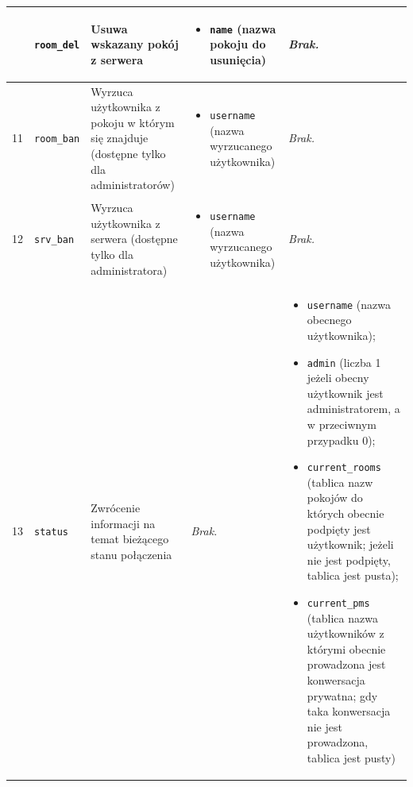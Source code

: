 {\begin{longtable}{ | l | l | l | l | l | }
{} & \parbox[t]{1.7cm}{\strut
	\texttt{room\_del}

\strut} & \parbox{4.1cm}{
	Usuwa wskazany pokój z serwera

} & \parbox{3.9cm}{
	\begin{itemize}
		\item \texttt{name} (nazwa pokoju do usunięcia)
	\end{itemize}


} & \parbox{3.9cm}{
	\textit{Brak.}
} \\

\hline

\parbox[t]{0.8cm}{
	11

} & \parbox[t]{1.7cm}{\strut
	\texttt{room\_ban}

\strut} & \parbox{4.1cm}{
	Wyrzuca użytkownika z pokoju w którym się znajduje (dostępne tylko dla administratorów)

} & \parbox{3.9cm}{
	\begin{itemize}
		\item \texttt{username} (nazwa wyrzucanego użytkownika)
	\end{itemize}


} & \parbox{3.9cm}{
	\textit{Brak.}
} \\

\hline

\parbox[t]{0.8cm}{
	12

} & \parbox[t]{1.7cm}{\strut
	\texttt{srv\_ban}

\strut} & \parbox{4.1cm}{
	Wyrzuca użytkownika z serwera (dostępne tylko dla administratora)

} & \parbox{3.9cm}{
	\begin{itemize}
		\item \texttt{username} (nazwa wyrzucanego użytkownika)
	\end{itemize}


} & \parbox{3.9cm}{
	\textit{Brak.}
} \\

\hline

\parbox[t]{0.8cm}{
	13

} & \parbox[t]{1.7cm}{\strut
	\texttt{status}

\strut} & \parbox{4.1cm}{
	Zwrócenie informacji na temat bieżącego stanu połączenia

} & \parbox{3.9cm}{
	\textit{Brak.}


} & \parbox{3.9cm}{
	\begin{itemize}
		\item \texttt{username} (nazwa obecnego użytkownika);
		\item \texttt{admin} (liczba 1 jeżeli obecny użytkownik jest administratorem, a w przeciwnym przypadku 0);
		\item \texttt{current\_rooms} (tablica nazw pokojów do których obecnie
		podpięty jest użytkownik; jeżeli nie jest podpięty, tablica jest pusta);
		\item \texttt{current\_pms} (tablica nazwa użytkowników z którymi obecnie
		prowadzona jest konwersacja prywatna; gdy taka konwersacja nie jest
		prowadzona, tablica jest pusty)
	\end{itemize}
} \\


\end{longtable}}
